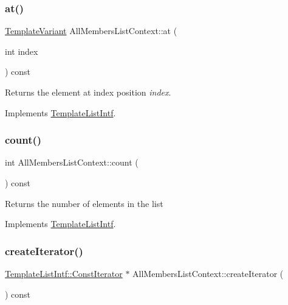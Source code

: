 \subsubsection{\texorpdfstring{at()}{at()}}
{\footnotesize\ttfamily \mbox{\hyperlink{class_template_variant}{Template\+Variant}} All\+Members\+List\+Context\+::at (\begin{DoxyParamCaption}\item[{int}]{index }\end{DoxyParamCaption}) const\hspace{0.3cm}{\ttfamily [virtual]}}

Returns the element at index position {\itshape index}. 

Implements \mbox{\hyperlink{class_template_list_intf_aa51e57e72eacf4e8ce1055ee30a0f7f8}{Template\+List\+Intf}}.

\mbox{\label{class_all_members_list_context_acf212002a620916c1d075acbdf3e1eba}} 
\subsubsection{\texorpdfstring{count()}{count()}}
{\footnotesize\ttfamily int All\+Members\+List\+Context\+::count (\begin{DoxyParamCaption}{ }\end{DoxyParamCaption}) const\hspace{0.3cm}{\ttfamily [virtual]}}

Returns the number of elements in the list 

Implements \mbox{\hyperlink{class_template_list_intf_a329e49e33484c2aa5106aac1bf4e5216}{Template\+List\+Intf}}.

\mbox{\label{class_all_members_list_context_a9ae93051de2e2e40707514c17e6f44f6}} 
\subsubsection{\texorpdfstring{createIterator()}{createIterator()}}
{\footnotesize\ttfamily \mbox{\hyperlink{class_template_list_intf_1_1_const_iterator}{Template\+List\+Intf\+::\+Const\+Iterator}} $\ast$ All\+Members\+List\+Context\+::create\+Iterator (\begin{DoxyParamCaption}{ }\end{DoxyParamCaption}) const\hspace{0.3cm}{\ttfamily [virtual]}}

